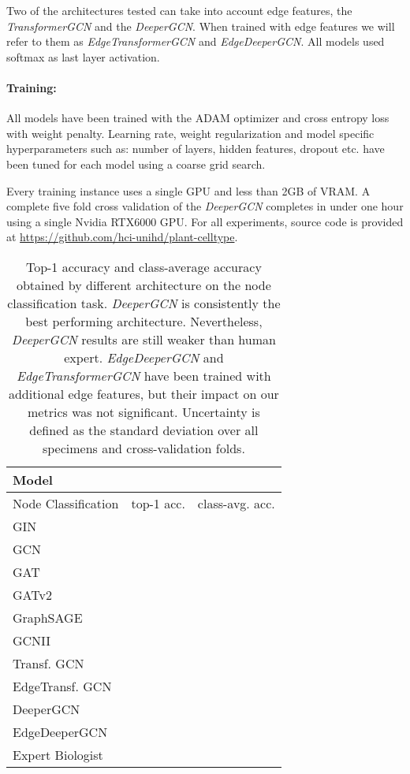 \documentclass[10pt,twocolumn,letterpaper]{article}
\begin{document}
Two of the architectures tested can take into account edge features, the \textit{TransformerGCN} and the \textit{DeeperGCN}. When trained with edge features we will refer to them as \textit{EdgeTransformerGCN} and \textit{EdgeDeeperGCN}.
All models used softmax as last layer activation. 

\paragraph{Training:} All models have been trained with the ADAM optimizer \cite{kingma2015adam} and cross entropy loss with  weight penalty. Learning rate, weight regularization and model specific hyperparameters such as: number of layers, hidden features, dropout etc. have been tuned for each model using a coarse grid search.

Every training instance uses a single GPU and less than 2GB of VRAM. A complete five fold cross validation of the \textit{DeeperGCN} completes in under one hour using a single Nvidia RTX6000 GPU. For all experiments, source code is provided at \url{https://github.com/hci-unihd/plant-celltype}.

\begin{table}
  \centering
  \begin{tabular}{@{}lcc@{}}
    \toprule
    Model \\
    \midrule
    Node Classification & top-1 acc. & class-avg. acc.\\
    \midrule
    GIN \cite{xu2018powerful} &  &  \\
    GCN \cite{kipf2016semi} &  &  \\ 
    GAT \cite{velickovic2018graph} &  &  \\
    GATv2 \cite{brody2021attentive} &  &  \\
    GraphSAGE \cite{hamilton2017inductive} &  &  \\
    GCNII \cite{chen2020simple} &  &  \\
    Transf. GCN \cite{shi2020masked} &  &  \\
    EdgeTransf. GCN \cite{shi2020masked} & &  \\
    DeeperGCN \cite{li2020deepergcn} &   &  \\ 
    EdgeDeeperGCN \cite{li2020deepergcn} &  &  \\  
    \midrule
    Expert Biologist &  &  \\ 
    \bottomrule
  \end{tabular}
  \caption{Top-1 accuracy and class-average accuracy obtained by different architecture on the node classification task. \textit{DeeperGCN} is consistently the best performing architecture. Nevertheless, \textit{DeeperGCN} results are still weaker than human expert. \textit{EdgeDeeperGCN} and \textit{EdgeTransformerGCN} have been trained with additional edge features, but their impact on our metrics was not significant. Uncertainty is defined as the standard deviation over all specimens and cross-validation folds.}
  \label{tab:node_class_eval}
\end{table}
\end{document}
